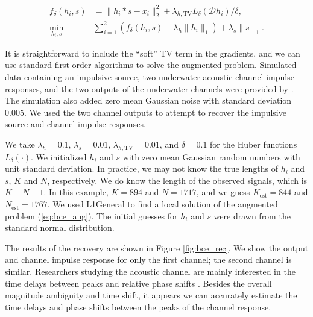 \documentclass[journal]{IEEEtran}
\begin{document}
\begin{align}
   \label{eq:bce_aug}
   f_\delta(h_i,s) &= \|h_i\ast s - x_i\|_2^2 + \lambda_{h,\text{TV}}L_\delta(\mathcal{D}h_i)/\delta,\nonumber\\
   \min_{h_i,s} ~&\sum_{i=1}^2\left(f_\delta(h_i,s) + \lambda_h\|h_i\|_1\right) + \lambda_s\|s\|_1.
\end{align}

It is straightforward to include the ``soft'' TV term in the gradients, and we can use standard first-order algorithms to solve the augmented problem.  Simulated data containing an impulsive source, two underwater acoustic channel impulse responses, and the two outputs of the underwater channels were provided by \cite{rideout_2016}.  The simulation also added zero mean Gaussian noise with standard deviation $0.005$.  We used the two channel outputs to attempt to recover the impulsive source and channel impulse responses.

We take $\lambda_h = 0.1$, $\lambda_s=0.01$, $\lambda_{h,\text{TV}}=0.01$, and $\delta=0.1$ for the Huber functions $L_\delta(\cdot)$.  We initialized $h_i$ and $s$ with zero mean Gaussian random numbers with unit standard deviation.  In practice, we may not know the true lengths of $h_i$ and $s$, $K$ and $N$, respectively.  We do know the length of the observed signals, which is $K+N-1$.  In this example, $K=894$ and $N=1717$, and we guess $K_\text{est}=844$ and $N_\text{est}=1767$.  We used L1General \cite{schmidt_2010} to find a local solution of the augmented problem (\ref{eq:bce_aug}).  The initial guesses for $h_i$ and $s$ were drawn from the standard normal distribution.

The results of the recovery are shown in Figure \ref{fig:bce_rec}.  We show the output and channel impulse response for only the first channel; the second channel is similar.  Researchers studying the acoustic channel are mainly interested in the time delays between peaks and relative phase shifts \cite{rideout_2016}.  Besides the overall magnitude ambiguity and time shift, it appears we can accurately estimate the time delays and phase shifts between the peaks of the channel response.
\end{document}
